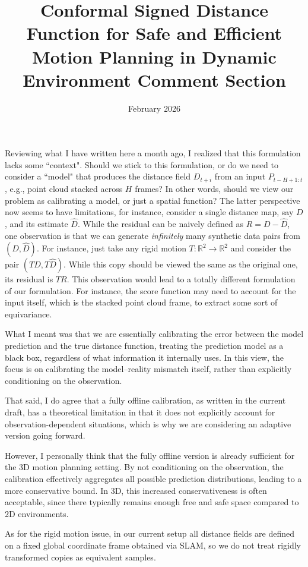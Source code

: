 \documentclass{article}
\title{Conformal Signed Distance Function for Safe and Efficient Motion Planning in Dynamic Environment Comment Section}
\author{}
\date{February 2026}
\begin{document}
{\color{teal}Reviewing what I have written here a month ago, I realized that this formulation lacks some ``context". Should we stick to this formulation, or do we need to consider a ``model" that produces the distance field $D_{t+i}$ from an input $P_{t-H+1:t}$, e.g., point cloud stacked across $H$ frames? In other words, should we view our problem as calibrating a model, or just a spatial function? The latter perspective now seems to have limitations, for instance, consider a single distance map, say $D$, and its estimate $\hat{D}$. While the residual can be naively defined as $R = D - \hat{D}$, one observation is that we can generate \textit{infinitely} many synthetic data pairs from $(D, \hat{D})$. For instance, just take any rigid motion $T: \mathbb{R}^2 \to \mathbb{R}^2$ and consider the pair $(TD, T\hat{D})$. While this copy should be viewed the same as the original one, its residual is $TR$. This observation would lead to a totally different formulation of our formulation. For instance, the score function may need to account for the input itself, which is the stacked point cloud frame, to extract some sort of equivariance.}

{\color{red} 
What I meant was that we are essentially calibrating the error between the model
prediction and the true distance function, treating the prediction model as a
black box, regardless of what information it internally uses. In this view, the
focus is on calibrating the model–reality mismatch itself, rather than
explicitly conditioning on the observation.

That said, I do agree that a fully offline calibration, as written in the
current draft, has a theoretical limitation in that it does not explicitly
account for observation-dependent situations, which is why we are considering
an adaptive version going forward.

However, I personally think that the fully offline version is already
sufficient for the 3D motion planning setting. By not conditioning on the
observation, the calibration effectively aggregates all possible prediction
distributions, leading to a more conservative bound. In 3D, this increased
conservativeness is often acceptable, since there typically remains enough
free and safe space compared to 2D environments.

As for the rigid motion issue, in our current setup all distance fields are
defined on a fixed global coordinate frame obtained via SLAM, so we do not
treat rigidly transformed copies as equivalent samples. }
\end{document}
